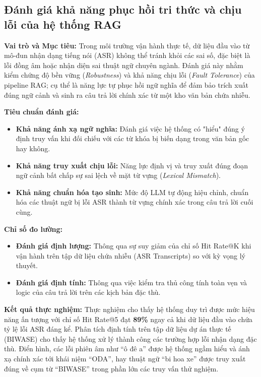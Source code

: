 \subsection{Đánh giá khả năng phục hồi tri thức và chịu lỗi của hệ thống RAG}
\label{subsec:rag_robustness}

\textbf{Vai trò và Mục tiêu:}
Trong môi trường vận hành thực tế, dữ liệu đầu vào từ mô-đun nhận dạng tiếng nói (ASR) không thể tránh khỏi các sai số, đặc biệt là lỗi đồng âm hoặc nhận diện sai thuật ngữ chuyên ngành. Đánh giá này nhằm kiểm chứng độ bền vững (\textit{Robustness}) và khả năng chịu lỗi (\textit{Fault Tolerance}) của pipeline RAG; cụ thể là năng lực tự phục hồi ngữ nghĩa để đảm bảo trích xuất đúng ngữ cảnh và sinh ra câu trả lời chính xác từ một kho văn bản chứa nhiễu.

\textbf{Tiêu chuẩn đánh giá:}
\begin{itemize}
    \item \textbf{Khả năng ánh xạ ngữ nghĩa:} Đánh giá việc hệ thống có "hiểu" đúng ý định truy vấn khi đối chiếu với các từ khóa bị biến dạng trong văn bản gốc hay không.
    \item \textbf{Khả năng truy xuất chịu lỗi:} Năng lực định vị và truy xuất đúng đoạn ngữ cảnh bất chấp sự sai lệch về mặt từ vựng (\textit{Lexical Mismatch}).
    \item \textbf{Khả năng chuẩn hóa tạo sinh:} Mức độ LLM tự động hiệu chỉnh, chuẩn hóa các thuật ngữ bị lỗi ASR thành từ vựng chính xác trong câu trả lời cuối cùng.
\end{itemize}

\textbf{Chỉ số đo lường:}
\begin{itemize}
    \item \textbf{Đánh giá định lượng:} Thông qua sự suy giảm của chỉ số Hit Rate@K khi vận hành trên tập dữ liệu chứa nhiễu (ASR Transcripts) so với kỳ vọng lý thuyết.
    \item \textbf{Đánh giá định tính:} Thông qua việc kiểm tra thủ công tính toàn vẹn và logic của câu trả lời trên các kịch bản đặc thù.
\end{itemize}

\textbf{Kết quả thực nghiệm:}
Thực nghiệm cho thấy hệ thống duy trì được mức hiệu năng ấn tượng với chỉ số Hit Rate@5 đạt \textbf{89\%} ngay cả khi dữ liệu đầu vào chứa tỷ lệ lỗi ASR đáng kể. Phân tích định tính trên tập dữ liệu dự án thực tế (BIWASE) cho thấy hệ thống xử lý thành công các trường hợp lỗi nhận dạng đặc thù. Điển hình, các lỗi phiên âm như ``ô đê a'' được hệ thống ngầm hiểu và ánh xạ chính xác tới khái niệm ``ODA'', hay thuật ngữ ``bi hoa xe'' được truy xuất đúng về cụm từ ``BIWASE'' trong phần lớn các truy vấn thử nghiệm.

